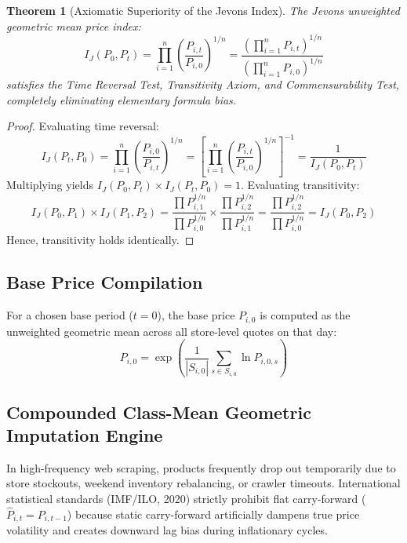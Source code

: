 \documentclass[11pt,a4paper]{article}
\newtheorem{theorem}{Theorem}
\begin{document}
\begin{theorem}[Axiomatic Superiority of the Jevons Index]
The Jevons unweighted geometric mean price index:
\begin{equation}
I_J(P_0, P_t) = \prod_{i=1}^n \left( \frac{P_{i,t}}{P_{i,0}} \right)^{1/n} = \frac{\left( \prod_{i=1}^n P_{i,t} \right)^{1/n}}{\left( \prod_{i=1}^n P_{i,0} \right)^{1/n}}
\end{equation}
satisfies the Time Reversal Test, Transitivity Axiom, and Commensurability Test, completely eliminating elementary formula bias.
\end{theorem}

\begin{proof}
Evaluating time reversal:
\begin{equation}
I_J(P_t, P_0) = \prod_{i=1}^n \left( \frac{P_{i,0}}{P_{i,t}} \right)^{1/n} = \left[ \prod_{i=1}^n \left( \frac{P_{i,t}}{P_{i,0}} \right)^{1/n} \right]^{-1} = \frac{1}{I_J(P_0, P_t)}
\end{equation}
Multiplying yields $I_J(P_0, P_t) \times I_J(P_t, P_0) = 1$. Evaluating transitivity:
\begin{equation}
I_J(P_0, P_1) \times I_J(P_1, P_2) = \frac{\prod P_{i,1}^{1/n}}{\prod P_{i,0}^{1/n}} \times \frac{\prod P_{i,2}^{1/n}}{\prod P_{i,1}^{1/n}} = \frac{\prod P_{i,2}^{1/n}}{\prod P_{i,0}^{1/n}} = I_J(P_0, P_2)
\end{equation}
Hence, transitivity holds identically.
\end{proof}

\subsection{Base Price Compilation}
For a chosen base period ($t=0$), the base price $P_{i,0}$ is computed as the unweighted geometric mean across all store-level quotes on that day:
\begin{equation}
P_{i, 0} = \exp \left( \frac{1}{|S_{i, 0}|} \sum_{s \in S_{i, 0}} \ln P_{i, 0, s} \right)
\end{equation}

\subsection{Compounded Class-Mean Geometric Imputation Engine}
In high-frequency web scraping, products frequently drop out temporarily due to store stockouts, weekend inventory rebalancing, or crawler timeouts. International statistical standards (IMF/ILO, 2020) strictly prohibit flat carry-forward ($\widehat{P}_{i, t} = P_{i, t-1}$) because static carry-forward artificially dampens true price volatility and creates downward lag bias during inflationary cycles.
\end{document}
